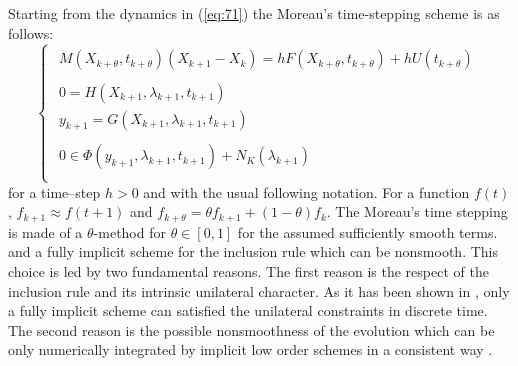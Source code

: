 Starting from the dynamics in (\ref{eq:71}) the Moreau's time-stepping scheme  is as follows:
\label{section24}
\begin{equation}
  \label{eq:71-discrete}
 \left\{ \begin{array}{l}
    \begin{array}{l}
  M(X_{k+\theta},t_{k+\theta}) (X_{k+1}-X_{k}) = h F(X_{k+\theta},t_{k+\theta}) + h U(t_{k+\theta})
\end{array}\\[2mm]
  \begin{array}{l}
    0 = H(X_{k+1},\lambda_{k+1},t_{k+1})\\
    y_{k+1} = G(X_{k+1},\lambda_{k+1},t_{k+1}) 
  \end{array} \\[5mm]
  \begin{array}{l}
  0 \in \Phi(y_{k+1},\lambda_{k+1},t_{k+1}) + N_K(\lambda_{k+1})
\end{array} \\
\end{array}\right.
\end{equation}
for a time--step $h>0$ and with the usual following notation. For a function $f(t)$, $ f_{k+1} \approx f(t+1)$ and $f_{k+\theta} = \theta f_{k+1} + (1-\theta) f_{k}$. The Moreau's time stepping is made of a $\theta$-method for $\theta \in [0,1]$ for the assumed sufficiently smooth terms. and a fully implicit scheme for the inclusion rule which can be nonsmooth. This choice is led by two fundamental reasons. The first reason is the respect of the inclusion rule and its intrinsic unilateral character.  As it has been shown in \cite{Moreau1977},  only a fully implicit scheme can satisfied the unilateral constraints in discrete time. The second reason is the possible nonsmoothness of the evolution  which  can be only  numerically integrated by implicit low order schemes in a consistent way \cite{acary-brogliato2008}.

